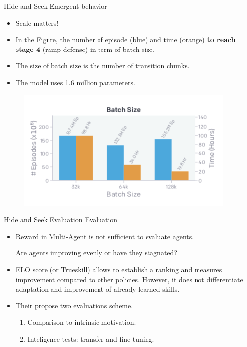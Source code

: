 \documentclass[9pt, hyperref={pdfusetitle,colorlinks=true,allcolors=DarkBlue}]{beamer}
\begin{document}
\begin{frame}{Hide and Seek Emergent behavior}
    \begin{itemize}
        \item Scale matters!
        \item In the Figure, the number of episode (blue) and time (orange) \textbf{to reach stage 4 }(ramp defense) in term of batch size.
        \item The size of batch size is the number of transition chunks.
        \item The model uses 1.6 million parameters.
    \end{itemize}{}
     
         \begin{figure}
        \centering
        \includegraphics[scale=0.6]{Figure4.png}
    \end{figure}{}
\end{frame}{}

\begin{frame}{Hide and Seek Evaluation}
Evaluation
\vfill
    \begin{itemize}
        \item Reward in Multi-Agent is not sufficient to evaluate agents.
        
        Are agents improving evenly or have they stagnated?
        \vfill
        \item ELO score (or Trueskill) allows to establish a ranking and measures improvement compared to other policies. However, it does not differentiate adaptation and improvement of already learned skills.
        \vfill
        \item Their propose two evaluations scheme.
        \vfill
        \begin{enumerate}
            \item Comparison to intrinsic motivation.
            \vfill
            \item Inteligence tests: transfer and fine-tuning.
            \vfill
        \end{enumerate}{}
    \end{itemize}{}
\end{frame}{}
\end{document}
